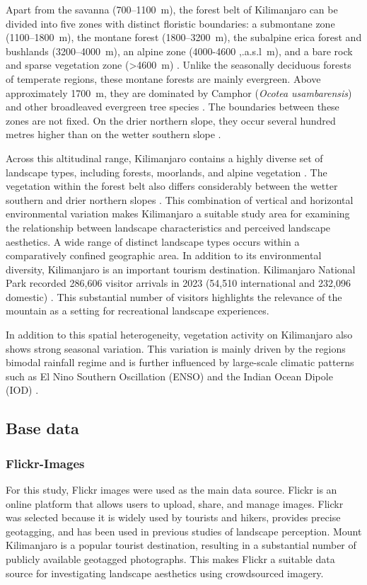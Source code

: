 \documentclass[11pt]{article}
\renewcommand{\_}{\textunderscore\allowbreak{}}
\begin{document}
Apart from the savanna (700--1100~m), the forest belt of Kilimanjaro can be divided into five zones with distinct floristic boundaries: a submontane zone (1100--1800~m), the montane forest (1800--3200~m), the subalpine erica forest and bushlands (3200--4000~m), an alpine zone (4000-4600 ,.a.s.l~m), and a bare rock and sparse vegetation zone (>4600~m) \citep{degano_perceptions_2025}. Unlike the seasonally deciduous forests of temperate regions, these montane forests are mainly evergreen. Above approximately 1700~m, they are dominated by Camphor (\textit{Ocotea usambarensis}) and other broadleaved evergreen tree species \citep{bussmann2006vegetation}. The boundaries between these zones are not fixed. On the drier northern slope, they occur several hundred metres higher than on the wetter southern slope \citep{hemp_continuum_2006}.

Across this altitudinal range, Kilimanjaro contains a highly diverse set of landscape types, including forests, moorlands, and alpine vegetation \citep{hemp_continuum_2006,bussmann2006vegetation}. The vegetation within the forest belt also differs considerably between the wetter southern and drier northern slopes \citep{hemp_continuum_2006}. This combination of vertical and horizontal environmental variation makes Kilimanjaro a suitable study area for examining the relationship between landscape characteristics and perceived landscape aesthetics. A wide range of distinct landscape types occurs within a comparatively confined geographic area. In addition to its environmental diversity, Kilimanjaro is an important tourism destination. Kilimanjaro National Park recorded 286,606 visitor arrivals in 2023 (54,510 international and 232,096 domestic) \citep{mnrt_statistical_bulletin_2023}. This substantial number of visitors highlights the relevance of the mountain as a setting for recreational landscape experiences.

In addition to this spatial heterogeneity, vegetation activity on Kilimanjaro also shows strong seasonal variation. This variation is mainly driven by the regions bimodal rainfall regime and is further influenced by large-scale climatic patterns such as El Nino Southern Oscillation (ENSO) and the Indian Ocean Dipole (IOD) \citep{detsch2016seasonal}.

\subsection{Base data}
\subsubsection{Flickr-Images}
For this study, Flickr images were used as the main data source. Flickr is an online platform that allows users to upload, share, and manage images. Flickr was selected because it is widely used by tourists and hikers, provides precise geotagging, and has been used in previous studies of landscape perception. Mount Kilimanjaro is a popular tourist destination, resulting in a substantial number of publicly available geotagged photographs. This makes Flickr a suitable data source for investigating landscape aesthetics using crowdsourced imagery.
\end{document}
